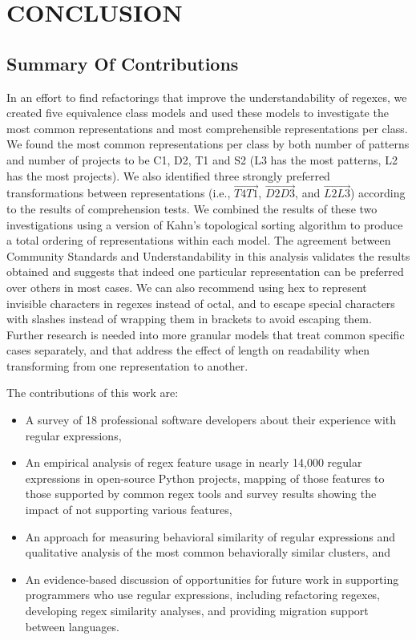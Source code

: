 \chapter{CONCLUSION}

\section{Summary Of Contributions}
In an effort to find refactorings that improve the understandability of regexes, we created five equivalence class models and used these models to investigate the most common representations and most comprehensible representations per class.  We found the most common representations per class by both number of patterns and number of projects to be C1, D2, T1 and S2 (L3 has the most patterns, L2 has the most projects).
We also identified three strongly preferred transformations between representations (i.e., $\overrightarrow{T4 T1}$, $\overrightarrow{D2 D3}$, and  $\overrightarrow{L2 L3}$) according to the results of comprehension tests.  We combined the results of these two investigations using a version of Kahn's topological sorting algorithm to produce a total ordering of representations within each model.  The agreement between Community Standards and Understandability in this analysis validates the results obtained and suggests that indeed one particular representation can be preferred over others in most cases.  We can also recommend using hex to represent invisible characters in regexes instead of octal, and to escape special characters with slashes instead of wrapping them in brackets to avoid escaping them.  Further research is needed into more granular models that treat common specific cases separately, and that address the effect of length on readability when transforming from one representation to another.


The contributions of this work are:
\begin{itemize} \setlength \itemsep{.1pt}
    \item A survey of 18 professional software developers about their experience with regular expressions,
    \item An empirical analysis of regex feature usage in nearly 14,000 regular expressions in  open-source Python projects, mapping of those features to those supported by common regex tools and survey results showing the impact of not supporting various features,
    \item An approach for measuring behavioral similarity of regular expressions and qualitative analysis of the most common behaviorally similar clusters, and
    \item An evidence-based discussion of opportunities for future work in supporting programmers who use regular expressions, including refactoring regexes, developing regex similarity analyses, and providing migration support between languages.
\end{itemize}
